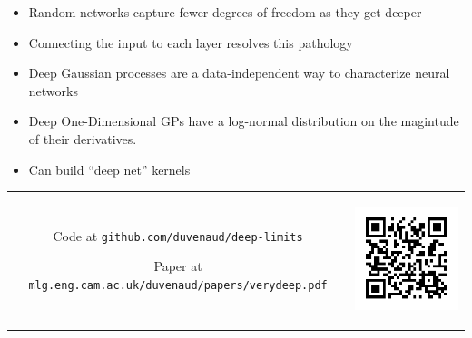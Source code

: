 \documentclass[landscape,a0b,final,a4resizeable]{include/a0poster}
\begin{document}
\begin{poster}
\begin{multicols}{3}
\begin{minipage}[c]{0.39\columnwidth}
\begin{centering}
\begin{tabular}{c}
\end{tabular}
\end{centering}
\end{minipage}








\begin{itemize}
	\item Random networks capture fewer degrees of freedom as they get deeper
	\item Connecting the input to each layer resolves this pathology
	\item Deep Gaussian processes are a data-independent way to characterize neural networks
	\item Deep One-Dimensional GPs have a log-normal distribution on the magintude of their derivatives.
	\item Can build ``deep net'' kernels
\end{itemize}


\raggedright

\begin{tabular}{cc}
\begin{minipage}[c]{0.8\columnwidth}

Code at \texttt{github.com/duvenaud/deep-limits}

Paper at \texttt{mlg.eng.cam.ac.uk/duvenaud/papers/verydeep.pdf}

\end{minipage}
&
\begin{minipage}[c]{0.2\columnwidth}
\begin{centering}
\includegraphics[width=\linewidth]{figures/qrcode-paper-link}
\end{centering}
\end{minipage}
\end{tabular}
%
%
%
\end{multicols}
\end{poster}
\end{document}
